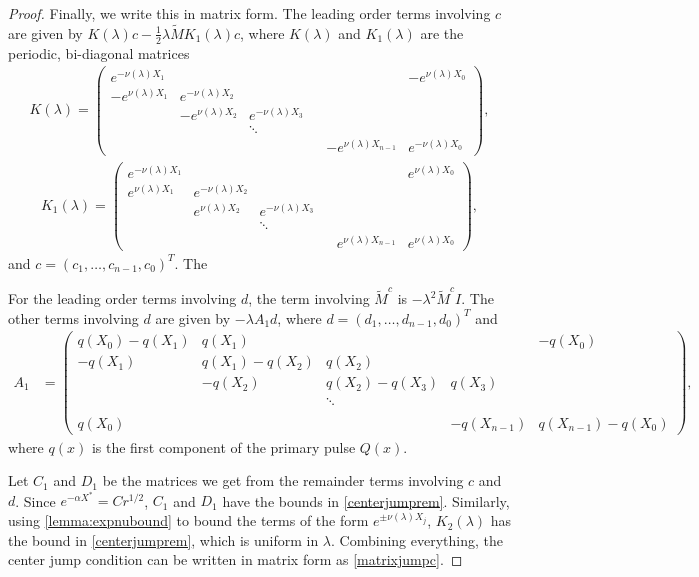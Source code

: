 \documentclass[thesis.tex]{subfiles}
\begin{document}
\begin{lemma}
\begin{proof}
Finally, we write this in matrix form. The leading order terms involving $c$ are given by $K(\lambda)c -\frac{1}{2} \lambda \tilde{M} K_1(\lambda) c$, where $K(\lambda)$ and $K_1(\lambda)$ are the periodic, bi-diagonal matrices
\begin{align*}
K(\lambda) =  
\begin{pmatrix}
e^{-\nu(\lambda)X_1} & & & & & -e^{\nu(\lambda)X_0} \\
-e^{\nu(\lambda)X_1} & e^{-\nu(\lambda)X_2} \\
& -e^{\nu(\lambda)X_2} & e^{-\nu(\lambda)X_3} \\
  & & \ddots & && \\
& & & & -e^{\nu(\lambda)X_{n-1}} & e^{-\nu(\lambda)X_0}
\end{pmatrix},
\end{align*}
\begin{align*}
K_1(\lambda) =  
\begin{pmatrix}
e^{-\nu(\lambda)X_1} & & & & & e^{\nu(\lambda)X_0} \\
e^{\nu(\lambda)X_1} & e^{-\nu(\lambda)X_2} \\
& e^{\nu(\lambda)X_2} & e^{-\nu(\lambda)X_3} \\
 & & \ddots & &&   \\
& & & & e^{\nu(\lambda)X_{n-1}} & e^{\nu(\lambda)X_0}
\end{pmatrix},
\end{align*}
and $c = (c_1, \dots, c_{n-1}, c_0)^T$. The 

For the leading order terms involving $d$, the term involving $\tilde{M}^c$ is $-\lambda^2 \tilde{M}^c I$. The other terms involving $d$ are given by $-\lambda A_1 d$, where $d = (d_1, \dots, d_{n-1}, d_0)^T$ and 
\begin{align*}
A_1 &= \begin{pmatrix}
q(X_0) - q(X_1) & q(X_1) &&& -q(X_0) \\
-q(X_1) & q(X_1) - q(X_2) & q(X_2) \\
& -q(X_2) & q(X_2) - q(X_3) & q(X_3) \\ && \ddots \\
\\
q(X_0) &&& -q(X_{n-1}) & q(X_{n-1}) - q(X_0) 
\end{pmatrix},
\end{align*}
where $q(x)$ is the first component of the primary pulse $Q(x)$.

Let $C_1$ and $D_1$ be the matrices we get from the remainder terms involving $c$ and $d$. Since $e^{-\alpha X^*} = C r^{1/2}$, $C_1$ and $D_1$ have the bounds in \cref{centerjumprem}. Similarly, using \cref{lemma:expnubound} to bound the terms of the form $e^{\pm \nu(\lambda)X_j}$, $K_2(\lambda)$ has the bound in \cref{centerjumprem}, which is uniform in $\lambda$. Combining everything, the center jump condition can be written in matrix form as \cref{matrixjumpc}.
\end{proof}
\end{lemma}
\end{document}
